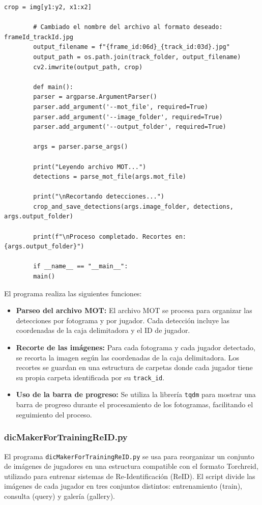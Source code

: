 \documentclass[12pt, a4paper, twoside]{article}
\begin{document}
\begin{lstlisting}[style=pythonstyle]
		crop = img[y1:y2, x1:x2]
		
		# Cambiado el nombre del archivo al formato deseado: frameId_trackId.jpg
		output_filename = f"{frame_id:06d}_{track_id:03d}.jpg"
		output_path = os.path.join(track_folder, output_filename)
		cv2.imwrite(output_path, crop)
		
		def main():
		parser = argparse.ArgumentParser()
		parser.add_argument('--mot_file', required=True)
		parser.add_argument('--image_folder', required=True)
		parser.add_argument('--output_folder', required=True)
		
		args = parser.parse_args()
		
		print("Leyendo archivo MOT...")
		detections = parse_mot_file(args.mot_file)
		
		print("\nRecortando detecciones...")
		crop_and_save_detections(args.image_folder, detections, args.output_folder)
		
		print(f"\nProceso completado. Recortes en: {args.output_folder}")
		
		if __name__ == "__main__":
		main()
	\end{lstlisting}
	\vspace{0.5cm}
	
	El programa realiza las siguientes funciones:
	
	\begin{itemize}
		\item \textbf{Parseo del archivo MOT:} El archivo MOT se procesa para organizar las detecciones por fotograma y por jugador. Cada detección incluye las coordenadas de la caja delimitadora y el ID de jugador.
		\item \textbf{Recorte de las imágenes:} Para cada fotograma y cada jugador detectado, se recorta la imagen según las coordenadas de la caja delimitadora. Los recortes se guardan en una estructura de carpetas donde cada jugador tiene su propia carpeta identificada por su \texttt{track\_id}.
		\item \textbf{Uso de la barra de progreso:} Se utiliza la librería \texttt{tqdm} para mostrar una barra de progreso durante el procesamiento de los fotogramas, facilitando el seguimiento del proceso.
	\end{itemize}
	
	
	\subsubsection{dicMakerForTrainingReID.py}
	
	El programa \texttt{dicMakerForTrainingReID.py} se usa para reorganizar un conjunto de imágenes de jugadores en una estructura compatible con el formato Torchreid, utilizado para entrenar sistemas de Re-Identificación (ReID). El script divide las imágenes de cada jugador en tres conjuntos distintos: entrenamiento (train), consulta (query) y galería (gallery).
	
\end{document}
